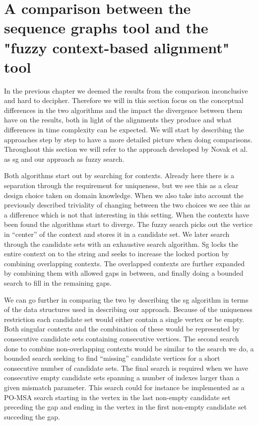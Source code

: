 \documentclass[thesis.tex]{subfiles}
\begin{document}
\section{A comparison between the sequence graphs tool and the "fuzzy context-based alignment" tool}
\label{sec:conceptual_comparison}
In the previous chapter we deemed the results from the comparison inconclusive and hard to decipher. Therefore we will in this section focus on the conceptual differences in the two algorithms and the impact the divergence between them have on the results, both in light of the alignments they produce and what differences in time complexity can be expected. We will start by describing the approaches step by step to have a more detailed picture when doing comparisons. Throughout this section we will refer to the approach developed by Novak et al. as sg and our approach as fuzzy search.\\
\par\noindent
Both algorithms start out by searching for contexts. Already here there is a separation through the requirement for uniqueness, but we see this as a clear design choice taken on domain knowledge. When we also take into account the previously described triviality of changing between the two choices we see this as a difference which is not that interesting in this setting. When the contexts have been found the algorithms start to diverge. The fuzzy search picks out the vertice in ``center'' of the context and stores it in a candidate set. We later search through the candidate sets with an exhaustive search algorithm. Sg locks the entire context on to the string and seeks to increase the locked portion by combining overlapping contexts. The overlapped contexts are further expanded by combining them with allowed gaps in between, and finally doing a bounded search to fill in the remaining gaps.\\
\par\noindent
We can go further in comparing the two by describing the sg algorithm in terms of the data structures used in describing our approach. Because of the uniqueness restriction each candidate set would either contain a single vertex or be empty. Both singular contexts and the combination of these would be represented by consecutive candidate sets containing consecutive vertices. The second search done to combine non-overlapping contexts would be similar to the search we do, a bounded search seeking to find ``missing'' candidate vertices for a short consecutive number of candidate sets. The final search is required when we have consecutive empty candidate sets spanning a number of indexes larger than a given mismatch parameter. This search could for instance be implemented as a PO-MSA search starting in the vertex in the last non-empty candidate set preceding the gap and ending in the vertex in the first non-empty candidate set succeding the gap.\\
\end{document}
